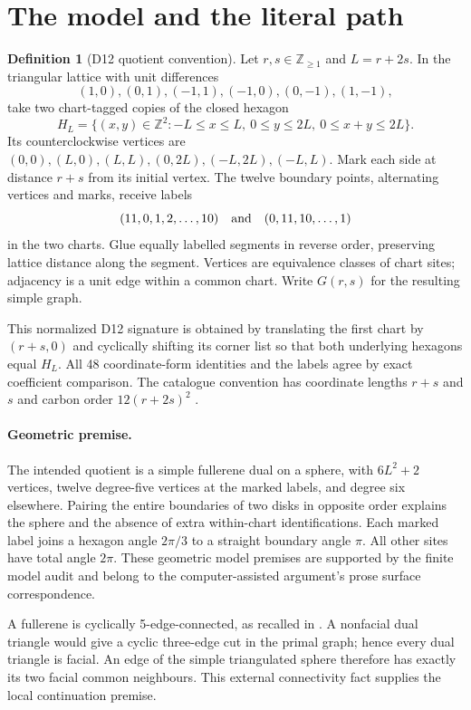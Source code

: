 \documentclass[11pt]{amsart}
\newcommand{\Z}{\mathbb Z}
\newcommand{\claimid}[1]{}
\theoremstyle{definition}\newtheorem{definition}[theorem]{Definition}
\begin{document}
\section{The model and the literal path}
\begin{definition}[D12 quotient convention]\label{def:d12-model}
Let $r,s\in\Z_{\ge1}$ and $L=r+2s$. In the triangular lattice with
unit differences
\[
 (1,0),(0,1),(-1,1),(-1,0),(0,-1),(1,-1),
\]
take two chart-tagged copies of the closed hexagon
\[
 H_L=\{(x,y)\in\Z^2:-L\le x\le L,\ 0\le y\le2L,
                         \ 0\le x+y\le2L\}.
\]
Its counterclockwise vertices are
$(0,0),(L,0),(L,L),(0,2L),(-L,2L),(-L,L)$.
Mark each side at distance $r+s$ from its initial vertex. The twelve
boundary points, alternating vertices and marks, receive labels
\[
 (11,0,1,2,\ldots,10)\quad\hbox{and}\quad(0,11,10,\ldots,1)
\]
in the two charts. Glue equally labelled segments in reverse order,
preserving lattice distance along the segment. Vertices are equivalence
classes of chart sites; adjacency is a unit edge within a common chart.
Write $G(r,s)$ for the resulting simple graph.
\end{definition}
\claimid{def:d12-model}

This normalized D12 signature is obtained by translating
the first chart by $(r+s,0)$ and cyclically shifting its corner list
so that both underlying hexagons equal $H_L$. All 48 coordinate-form
identities and the labels agree by exact coefficient comparison.
The catalogue convention has coordinate lengths $r+s$ and $s$ and
carbon order $12(r+2s)^2$ \cite[p.~12]{Graver}.

\paragraph{Geometric premise.}\label{lem:geometry}
The intended quotient is a simple fullerene dual on a sphere, with
$6L^2+2$ vertices, twelve degree-five vertices at the marked labels,
and degree six elsewhere. Pairing the entire boundaries of two disks
in opposite order explains the sphere and the absence of extra
within-chart identifications. Each marked label joins a hexagon angle
$2\pi/3$ to a straight boundary angle $\pi$. All other sites have total
angle $2\pi$. These geometric model premises are supported by the
finite model audit and belong to the computer-assisted argument's
prose surface correspondence.
\claimid{lem:geometry}

A fullerene is cyclically 5-edge-connected, as recalled in
\cite{Connectivity}. A nonfacial dual triangle would give a cyclic
three-edge cut in the primal graph; hence every dual triangle is facial.
An edge of the simple triangulated sphere therefore has exactly its two
facial common neighbours. This external connectivity fact supplies the local continuation premise.
\end{document}
